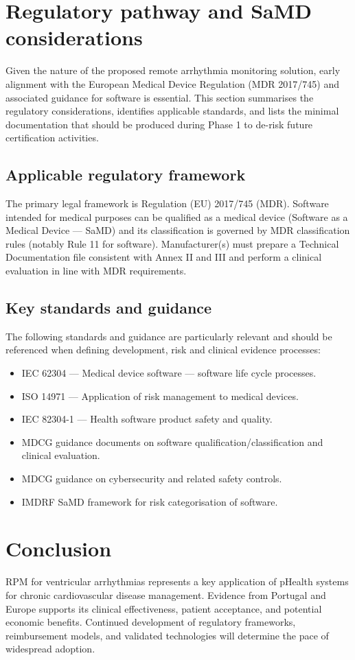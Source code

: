 \documentclass[conference]{IEEEtran}
\begin{document}
\section{Regulatory pathway and SaMD considerations}

Given the nature of the proposed remote arrhythmia monitoring solution, early
alignment with the European Medical Device Regulation (MDR 2017/745) and
associated guidance for software is essential. This section summarises the
regulatory considerations, identifies applicable standards, and lists the
minimal documentation that should be produced during Phase 1 to de-risk future
certification activities.

\subsection{Applicable regulatory framework}
The primary legal framework is Regulation (EU) 2017/745 (MDR). Software
intended for medical purposes can be qualified as a medical device (Software as
a Medical Device — SaMD) and its classification is governed by MDR
classification rules (notably Rule 11 for software). Manufacturer(s) must
prepare a Technical Documentation file consistent with Annex II and III and
perform a clinical evaluation in line with MDR requirements.

\subsection{Key standards and guidance}
The following standards and guidance are particularly relevant and should be
referenced when defining development, risk and clinical evidence processes:
\begin{itemize}
    \item IEC 62304 — Medical device software — software life cycle processes.
    \item ISO 14971 — Application of risk management to medical devices.
    \item IEC 82304-1 — Health software product safety and quality.
    \item MDCG guidance documents on software qualification/classification and clinical
          evaluation.
    \item MDCG guidance on cybersecurity and related safety controls.
    \item IMDRF SaMD framework for risk categorisation of software.
\end{itemize}

\section{Conclusion}

RPM for ventricular arrhythmias represents a key application of pHealth systems
for chronic cardiovascular disease management. Evidence from Portugal and
Europe supports its clinical effectiveness, patient acceptance, and potential
economic benefits. Continued development of regulatory frameworks,
reimbursement models, and validated technologies will determine the pace of
widespread adoption.



\end{document}

